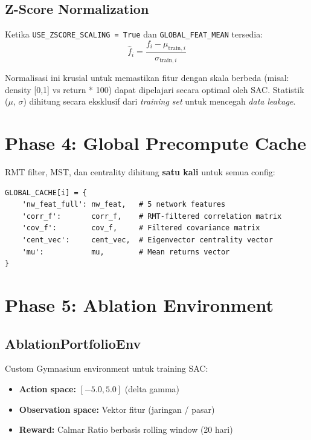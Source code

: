 \documentclass[12pt,a4paper]{article}
\begin{document}
\subsection{Z-Score Normalization}

Ketika \texttt{USE\_ZSCORE\_SCALING = True} dan \texttt{GLOBAL\_FEAT\_MEAN} tersedia:
\begin{equation}
  \hat{f}_i = \frac{f_i - \mu_{\text{train},i}}{\sigma_{\text{train},i}}
\end{equation}

Normalisasi ini krusial untuk memastikan fitur dengan skala berbeda (misal: density [0,1] vs return * 100) dapat dipelajari secara optimal oleh SAC. Statistik ($\mu$, $\sigma$) dihitung secara eksklusif dari \emph{training set} untuk mencegah \emph{data leakage}.

\section{Phase 4: Global Precompute Cache}

RMT filter, MST, dan centrality dihitung \textbf{satu kali} untuk semua config:

\begin{lstlisting}[caption={Struktur Global Cache}]
GLOBAL_CACHE[i] = {
    'nw_feat_full': nw_feat,   # 5 network features
    'corr_f':       corr_f,    # RMT-filtered correlation matrix
    'cov_f':        cov_f,     # Filtered covariance matrix
    'cent_vec':     cent_vec,  # Eigenvector centrality vector
    'mu':           mu,        # Mean returns vector
}
\end{lstlisting}

\section{Phase 5: Ablation Environment}

\subsection{AblationPortfolioEnv}

Custom Gymnasium environment untuk training SAC:

\begin{itemize}
  \item \textbf{Action space:} $[-5.0, 5.0]$ (delta gamma)
  \item \textbf{Observation space:} Vektor fitur (jaringan / pasar)
  \item \textbf{Reward:} Calmar Ratio berbasis rolling window (20 hari)
\end{itemize}
\end{document}
